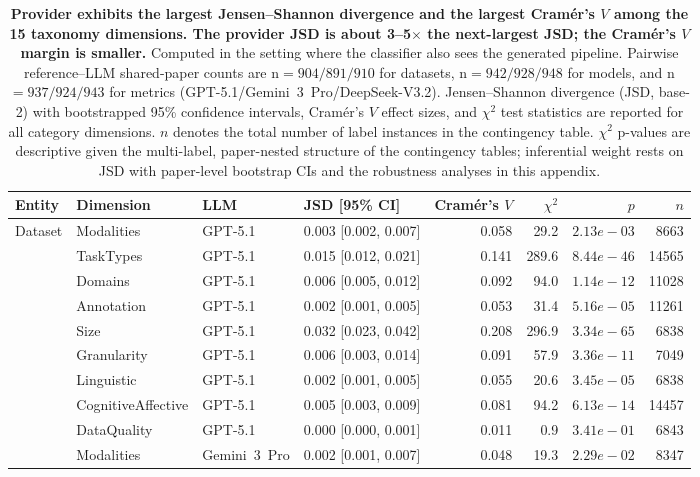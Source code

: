 \begin{table}[H]
\centering
\caption{\textbf{Provider exhibits the largest Jensen--Shannon divergence and the largest Cram\'{e}r's $V$ among the 15 taxonomy dimensions. The provider JSD is about 3--5$\times$ the next-largest JSD; the Cram\'{e}r's $V$ margin is smaller.} Computed in the setting where the classifier also sees the generated pipeline. Pairwise reference--LLM shared-paper counts are n$=904/891/910$ for datasets, n$=942/928/948$ for models, and n$=937/924/943$ for metrics (GPT-5.1/Gemini~3~Pro/DeepSeek-V3.2). Jensen--Shannon divergence (JSD, base-2) with bootstrapped 95\% confidence intervals, Cram\'{e}r's $V$ effect sizes, and $\chi^2$ test statistics are reported for all category dimensions. $n$ denotes the total number of label instances in the contingency table. $\chi^2$ p-values are descriptive given the multi-label, paper-nested structure of the contingency tables; inferential weight rests on JSD with paper-level bootstrap CIs and the robustness analyses in this appendix.}
\label{tab:effect_sizes}
\begin{adjustbox}{max width=\textwidth}
\footnotesize
\begin{tabular}{llllrrrr}
\toprule
Entity & Dimension & LLM & JSD [95\% CI] & Cram\'{e}r's $V$ & $\chi^2$ & $p$ & $n$ \\
\midrule
Dataset & Modalities & GPT-5.1 & 0.003 [0.002, 0.007] & 0.058 & 29.2 & $2.13e-03$ & 8663 \\
 & TaskTypes & GPT-5.1 & 0.015 [0.012, 0.021] & 0.141 & 289.6 & $8.44e-46$ & 14565 \\
 & Domains & GPT-5.1 & 0.006 [0.005, 0.012] & 0.092 & 94.0 & $1.14e-12$ & 11028 \\
 & Annotation & GPT-5.1 & 0.002 [0.001, 0.005] & 0.053 & 31.4 & $5.16e-05$ & 11261 \\
 & Size & GPT-5.1 & 0.032 [0.023, 0.042] & 0.208 & 296.9 & $3.34e-65$ & 6838 \\
 & Granularity & GPT-5.1 & 0.006 [0.003, 0.014] & 0.091 & 57.9 & $3.36e-11$ & 7049 \\
 & Linguistic & GPT-5.1 & 0.002 [0.001, 0.005] & 0.055 & 20.6 & $3.45e-05$ & 6838 \\
 & CognitiveAffective & GPT-5.1 & 0.005 [0.003, 0.009] & 0.081 & 94.2 & $6.13e-14$ & 14457 \\
 & DataQuality & GPT-5.1 & 0.000 [0.000, 0.001] & 0.011 & 0.9 & $3.41e-01$ & 6843 \\
 & Modalities & Gemini~3~Pro & 0.002 [0.001, 0.007] & 0.048 & 19.3 & $2.29e-02$ & 8347 \\

\end{tabular}
\end{adjustbox}
\end{table}
